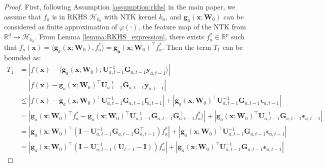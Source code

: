 \begin{proof}
First, following Assumption \ref{assumption:rkhs} in the main paper, we assume that $f_a$ is in RKHS $\mathcal{H}_{k_a}$ with NTK kernel $k_a$, and $\mathbf{g}_a(\mathbf{x}; \mathbf{W}_0)$  can be considered as finite approximation of $\varphi(\cdot)$, the feature map of the NTK from $\mathbb{R}^d \rightarrow \mathcal{H}_{k_a}$. From Lemma \ref{lemma:RKHS_expression}, there exists $f_a^* \in \mathbb{R}^p$ such that $f_a(\mathbf{x}) = \langle \mathbf{g}_a(\mathbf{x}; \mathbf{W}_0), f_a^* \rangle = \mathbf{g_a}(\mathbf{x}; \mathbf{W}_0)^\top f_a^*$. 
Then the term $T_1$ can be bounded as:
\begin{align*}
\label{ieqn:neural_cbo_confidence_interval}
         T_1 &= \left \lvert f(\mathbf{x}) - \langle \mathbf{g}_a(\mathbf{x}; \mathbf{W}_0); \mathbf{U}^{-1}_{a,t-1} \mathbf{G}_{a,t-1} \mathbf{y}_{a,t-1} \rangle   \right \rvert  
         \\
         & = \left\lvert f(\mathbf{x}) - \mathbf{g}_a(\mathbf{x}; \mathbf{W}_0)^\top  \mathbf{U}^{-1}_{a,t-1} \mathbf{G}_{a,t-1} \mathbf{y}_{a,t-1} \right\rvert 
         \\
        & \leq \left\lvert f(\mathbf{x}) - \mathbf{g}_a(\mathbf{x}; \mathbf{W}_0)^\top  \mathbf{U}^{-1}_{a,t-1}
        \mathbf{G}_{a,t-1}\mathbf{f}_{a, t-1} \right\rvert + 
        \left\lvert \mathbf{g}_a(\mathbf{x}; \mathbf{W}_0)^\top \mathbf{U}^{-1}_{a,t-1}
        \mathbf{G}_{a,t-1} \boldsymbol{\epsilon}_{a, t-1} \right\rvert
        \\
        & = \left\lvert \mathbf{g}_a(\mathbf{x}; \mathbf{W}_0)^\top f_a^* - \mathbf{g}_a(\mathbf{x}; \mathbf{W}_0)^\top  \mathbf{U}^{-1}_{a,t-1} 
        \mathbf{G}_{a,t-1}
        \mathbf{G}_{a,t-1}^\top f_a^* \rangle \right\rvert + 
        \left\rvert  \mathbf{g}_a(\mathbf{x}; \mathbf{W}_0)^\top \mathbf{U}^{-1}_{a,t-1} \mathbf{G}_{a,t-1} \boldsymbol{\epsilon}_{a, t-1}  \right\rvert
        \\
        & = \left\lvert \mathbf{g}_a(\mathbf{x}; \mathbf{W}_0)^\top \left( \mathbf{I} -  \mathbf{U}^{-1}_{a,t-1}  \mathbf{G}_{a,t-1} \mathbf{G}_{a,t-1}^\top  \right) f_a^*  \right \vert + 
        \left\lvert  \mathbf{g}_a(\mathbf{x}; \mathbf{W}_0)^\top \mathbf{U}^{-1}_{a,t-1} \mathbf{G}_{a,t-1} \boldsymbol{\epsilon}_{a, t-1}  \right\rvert 
        \\
        & = \left\lvert \mathbf{g}_a(\mathbf{x}; \mathbf{W}_0)^\top \left( \mathbf{I} -  \mathbf{U}^{-1}_{a,t-1} \left( \mathbf{U}_{t-1} - \mathbf{I} \right)  \right) f_a^*  \right \vert +
        \left \lvert  \mathbf{g}_a(\mathbf{x}; \mathbf{W}_0)^\top \mathbf{U}^{-1}_{a,t-1} \mathbf{G}_{a,t-1} \boldsymbol{\epsilon}_{a, t-1}  \right \rvert 

\end{align*}
\end{proof}
